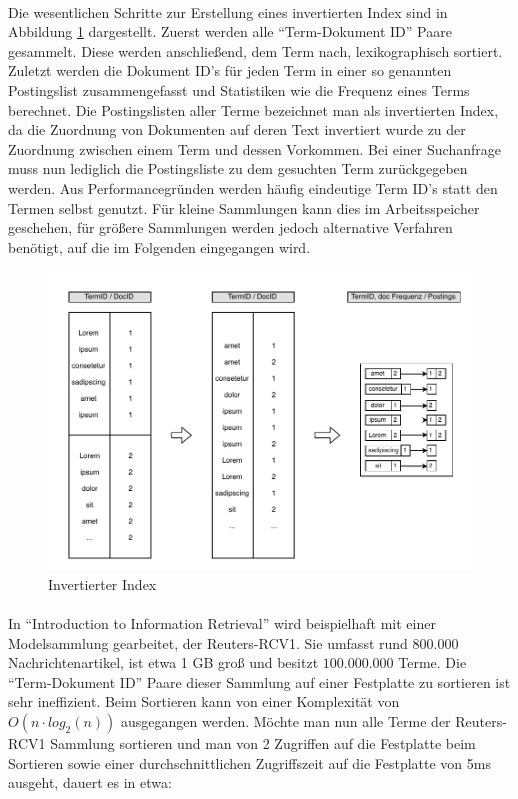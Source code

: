 \paragraph{}
Die wesentlichen Schritte zur Erstellung eines invertierten Index sind in Abbildung \ref{postingssList} dargestellt. Zuerst werden alle \enquote{Term-Dokument ID} Paare gesammelt. Diese werden anschließend, dem Term nach, lexikographisch sortiert. Zuletzt werden die Dokument ID's für jeden Term in einer so genannten Postingslist zusammengefasst und Statistiken wie die Frequenz eines Terms berechnet. Die Postingslisten aller Terme bezeichnet man als invertierten Index, da die Zuordnung von Dokumenten auf deren Text invertiert wurde zu der Zuordnung zwischen einem Term und dessen Vorkommen. Bei einer Suchanfrage muss nun lediglich die Postingsliste zu dem gesuchten Term zurückgegeben werden. Aus Performancegründen werden häufig eindeutige Term ID's statt den Termen selbst genutzt. Für kleine Sammlungen kann dies im Arbeitsspeicher geschehen, für größere Sammlungen werden jedoch alternative Verfahren benötigt, auf die im Folgenden eingegangen wird.
\par

\begin{figure}[ht]
  \includegraphics[width=\textwidth,height=0.4\textheight]{pdf/postingslist3.pdf}
  \caption{Invertierter Index}
  \label{postingssList}
\end{figure}

\paragraph{}
In \enquote{Introduction to Information Retrieval}\cite{ir} wird beispielhaft mit einer Modelsammlung gearbeitet, der Reuters-RCV1. Sie umfasst rund $800.000$ Nachrichtenartikel, ist etwa 1 GB groß und besitzt $100.000.000$ Terme. Die \enquote{Term-Dokument ID} Paare dieser Sammlung auf einer Festplatte zu sortieren ist sehr ineffizient. Beim Sortieren kann von einer Komplexität von $O(n \cdot log_2 (n))$ ausgegangen werden. Möchte man nun alle Terme der Reuters-RCV1 Sammlung sortieren und man von 2 Zugriffen auf die Festplatte beim Sortieren sowie einer durchschnittlichen Zugriffszeit auf die Festplatte von 5ms ausgeht, dauert es in etwa:

